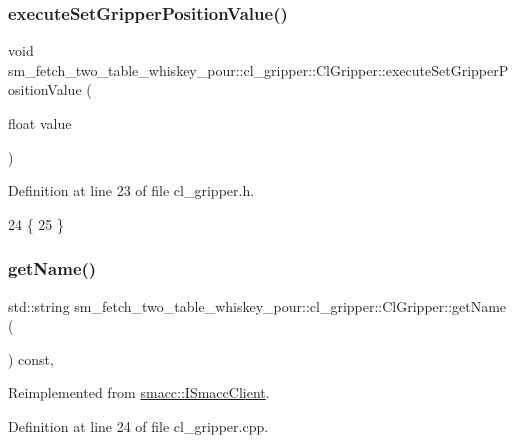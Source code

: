 \subsubsection{\texorpdfstring{execute\+Set\+Gripper\+Position\+Value()}{executeSetGripperPositionValue()}}
{\footnotesize\ttfamily void sm\+\_\+fetch\+\_\+two\+\_\+table\+\_\+whiskey\+\_\+pour\+::cl\+\_\+gripper\+::\+Cl\+Gripper\+::execute\+Set\+Gripper\+Position\+Value (\begin{DoxyParamCaption}\item[{float}]{value }\end{DoxyParamCaption})\hspace{0.3cm}{\ttfamily [inline]}}



Definition at line 23 of file cl\+\_\+gripper.\+h.


\begin{DoxyCode}
24   \{
25   \}
\end{DoxyCode}
\mbox{\label{classsm__fetch__two__table__whiskey__pour_1_1cl__gripper_1_1ClGripper_a9790f119467bb9021f50d6a467f49108}} 
\subsubsection{\texorpdfstring{get\+Name()}{getName()}}
{\footnotesize\ttfamily std\+::string sm\+\_\+fetch\+\_\+two\+\_\+table\+\_\+whiskey\+\_\+pour\+::cl\+\_\+gripper\+::\+Cl\+Gripper\+::get\+Name (\begin{DoxyParamCaption}{ }\end{DoxyParamCaption}) const\hspace{0.3cm}{\ttfamily [override]}, {\ttfamily [virtual]}}



Reimplemented from \hyperlink{classsmacc_1_1ISmaccClient_a8c3ce19f182e71909c5dc6263d25be69}{smacc\+::\+I\+Smacc\+Client}.



Definition at line 24 of file cl\+\_\+gripper.\+cpp.


